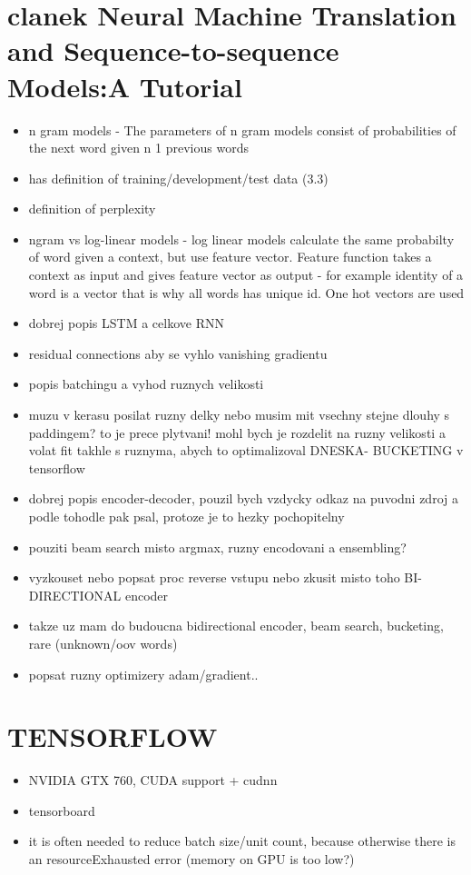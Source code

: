 \section{clanek Neural Machine Translation and Sequence-to-sequence Models:A Tutorial}
\begin{itemize}
  \item n gram models - The parameters of n gram models consist of probabilities of the next word given n 1 previous words
  \item has definition of training/development/test data (3.3)
  \item definition of perplexity
  \item ngram vs log-linear models - log linear models calculate the same probabilty of word given a context, but use feature vector. Feature function takes a context as input and gives feature vector as output - for example identity of a word is a vector that is why all words has unique id. One hot vectors are used
  \item dobrej popis LSTM a celkove RNN
  \item residual connections aby se vyhlo vanishing gradientu
  \item popis batchingu a vyhod ruznych velikosti
  \item muzu v kerasu posilat ruzny delky nebo musim mit vsechny stejne dlouhy s paddingem? to je prece plytvani! mohl bych je rozdelit na ruzny velikosti a volat fit takhle s ruznyma, abych to optimalizoval DNESKA- BUCKETING v tensorflow
  \item dobrej popis encoder-decoder, pouzil bych vzdycky odkaz na puvodni zdroj a podle tohodle pak psal, protoze je to hezky pochopitelny
  \item pouziti beam search misto argmax, ruzny encodovani a ensembling?
  \item vyzkouset nebo popsat proc reverse vstupu nebo zkusit misto toho BI-DIRECTIONAL encoder
  \item takze uz mam do budoucna bidirectional encoder, beam search, bucketing, rare (unknown/oov words)
  \item popsat ruzny optimizery adam/gradient..
\end{itemize}

\section{TENSORFLOW}
\begin{itemize}
  \item NVIDIA GTX 760, CUDA support + cudnn
  \item tensorboard
  \item it is often needed to reduce batch size/unit count, because otherwise there is an resourceExhausted error (memory on GPU is too low?)
\end{itemize}

